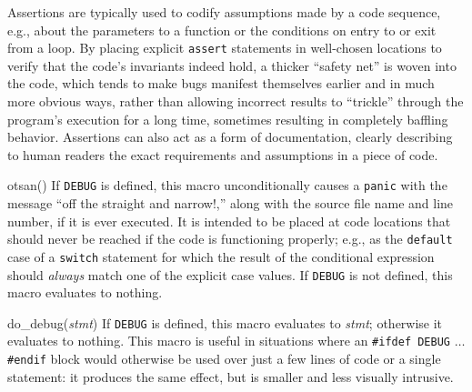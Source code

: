 \begin{apidesc}
\begin{csymlist}
		Assertions are typically used
		to codify assumptions made by a code sequence,
		e.g., about the parameters to a function
		or the conditions on entry to or exit from a loop.
		By placing explicit {\tt assert} statements
		in well-chosen locations to verify
		that the code's invariants indeed hold,
		a thicker ``safety net'' is woven into the code,
		which tends to make bugs manifest themselves
		earlier and in much more obvious ways,
		rather than allowing incorrect results to ``trickle''
		through the program's execution for a long time,
		sometimes resulting in completely baffling behavior.
		Assertions can also act as a form of documentation,
		clearly describing to human readers
		the exact requirements and assumptions in a piece of code.
	\item[otsan()]			
		If {\tt DEBUG} is defined,
		this macro unconditionally causes a {\tt panic}
		with the message ``off the straight and narrow!,''
		along with the source file name and line number,
		if it is ever executed.
		It is intended to be placed at code locations
		that should never be reached
		if the code is functioning properly;
		e.g., as the {\tt default} case of a {\tt switch} statement
		for which the result of the conditional expression
		should \emph{always} match one of the explicit case values.
		If {\tt DEBUG} is not defined,
		this macro evaluates to nothing.

	\item[do_debug(\emph{stmt})]	
		If {\tt DEBUG} is defined,
		this macro evaluates to \emph{stmt};
		otherwise it evaluates to nothing.
		This macro is useful in situations
		where an {\tt \#ifdef DEBUG} $\dots$ {\tt \#endif} block
		would otherwise be used over just a few lines of code
		or a single statement:
		it produces the same effect,
		but is smaller and less visually intrusive.
	\end{csymlist}


\end{apidesc}

